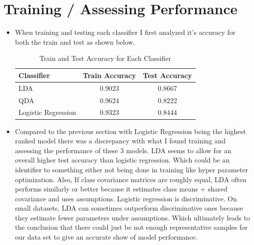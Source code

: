 \documentclass[12pt]{article}
\begin{document}
\section{Training / Assessing Performance}
\begin{itemize}
    \item When training and testing each classifier I first analyzed it's accuracy for both the train and test as shown below.

\begin{table}[h!]
\centering

\begin{tabular}{lcc}
\hline
Classifier           & Train Accuracy & Test Accuracy \\
\hline
LDA                  & 0.9023         & 0.8667        \\
QDA                  & 0.9624         & 0.8222        \\
Logistic Regression  & 0.9323         & 0.8444        \\
\hline
\end{tabular}
\caption{Train and Test Accuracy for Each Classifier}
\end{table}
    \item Compared to the previous section with Logistic Regression being the highest ranked model there was a discrepancy with what I found training and assessing the performance of these 3 models. LDA seems to allow for an overall higher test accuracy than logistic regression. Which could be an identifier to something either not being done in training like hyper parameter optimization. Also, If class covariance matrices are roughly equal, LDA often performs similarly or better because it estimates class means + shared covariance and uses assumptions. Logistic regression is discriminative. On small datasets, LDA can sometimes outperform discriminative ones because they estimate fewer parameters under assumptions. Which ultimately leads to the conclusion that there could just be not enough representative samples for our data set to give an accurate show of model performance.
\maketitle


\end{itemize}
\end{document}
